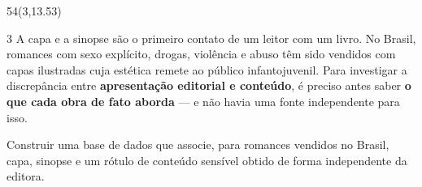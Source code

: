 \begin{textblock}{54}(3,13.53)
  \centering{\semib\fontsize{32}{38}\selectfont\color{cinzaescuro}\Autores\par}
\end{textblock}

\begin{coluna}{3}
  A capa e a sinopse são o primeiro contato de um leitor com um livro. No
  Brasil, romances com sexo explícito, drogas, violência e abuso têm sido vendidos com capas
  ilustradas cuja estética remete ao público infantojuvenil. Para investigar a discrepância
  entre \textbf{apresentação editorial e conteúdo}, é preciso antes saber \textbf{o que cada
  obra de fato aborda} --- e não havia uma fonte independente para isso.\par
  \vspace{0.4cm}
  \begin{destaque}[top=0.45cm,bottom=0.5cm,left=0.8cm,right=0.7cm]
    \par\vspace{0.1cm}
    {\fontsize{27}{33}\selectfont Construir uma base de dados que associe, para romances
    vendidos no Brasil, capa, sinopse e um rótulo de conteúdo sensível obtido de forma
    independente da editora.\par}
  \end{destaque}
\proxima


\end{coluna}
